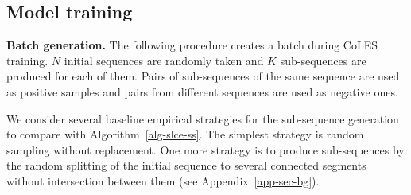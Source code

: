 \documentclass{article}
\begin{document}
\subsection{Model training} \label{sec-training}

\textbf{Batch generation.} The following procedure creates a batch during CoLES training. $N$ initial sequences are randomly taken and $K$ sub-sequences are produced for each of them. Pairs of sub-sequences of the same sequence are used as positive samples and pairs from different sequences are used as negative ones.

We consider several baseline empirical strategies for the sub-sequence generation to compare with Algorithm~\ref{alg-slce-ss}. The simplest strategy is random sampling without replacement.
One more strategy is to produce sub-sequences by the random splitting of the initial sequence to several connected segments without intersection between them
(see Appendix~\ref{app-sec-bg}). %




\end{document}
